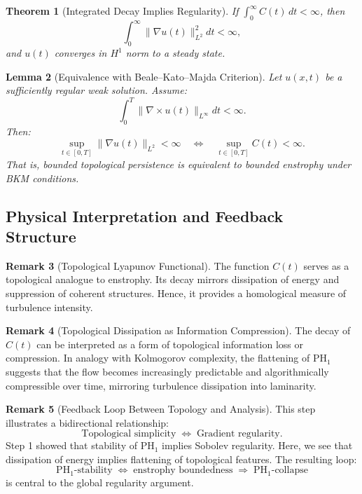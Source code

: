 \documentclass[11pt]{article}
\newtheorem{theorem}{Theorem}[section]
\newtheorem{lemma}[theorem]{Lemma}
\theoremstyle{definition}
\newtheorem{remark}[theorem]{Remark}
\begin{document}
\begin{theorem}[Integrated Decay Implies Regularity]
If $\int_0^\infty C(t)\,dt < \infty$, then
\[
\int_0^\infty \|\nabla u(t)\|_{L^2}^2 dt < \infty,
\]
and $u(t)$ converges in $H^1$ norm to a steady state.
\end{theorem}

\begin{lemma}[Equivalence with Beale--Kato--Majda Criterion]
Let $u(x,t)$ be a sufficiently regular weak solution. Assume:
\[
\int_0^T \|\nabla \times u(t)\|_{L^\infty} dt < \infty.
\]
Then:
\[
\sup_{t \in [0,T]} \|\nabla u(t)\|_{L^2} < \infty \quad \Leftrightarrow \quad \sup_{t \in [0,T]} C(t) < \infty.
\]
That is, bounded topological persistence is equivalent to bounded enstrophy under BKM conditions.
\end{lemma}

\subsection{Physical Interpretation and Feedback Structure}

\begin{remark}[Topological Lyapunov Functional]
The function $C(t)$ serves as a topological analogue to enstrophy. Its decay mirrors dissipation of energy and suppression of coherent structures. Hence, it provides a homological measure of turbulence intensity.
\end{remark}

\begin{remark}[Topological Dissipation as Information Compression]
The decay of $C(t)$ can be interpreted as a form of topological information loss or compression. In analogy with Kolmogorov complexity, the flattening of $\mathrm{PH}_1$ suggests that the flow becomes increasingly predictable and algorithmically compressible over time, mirroring turbulence dissipation into laminarity.
\end{remark}

\begin{remark}[Feedback Loop Between Topology and Analysis]
This step illustrates a bidirectional relationship:
\[
\text{Topological simplicity} \;\Longleftrightarrow\; \text{Gradient regularity}.
\]
Step 1 showed that stability of $\mathrm{PH}_1$ implies Sobolev regularity. Here, we see that dissipation of energy implies flattening of topological features. The resulting loop:
\[
\mathrm{PH}_1\text{-stability} \;\Leftrightarrow\; \text{enstrophy boundedness} \;\Rightarrow\; \mathrm{PH}_1\text{-collapse}
\]
is central to the global regularity argument.
\end{remark}
\end{document}
